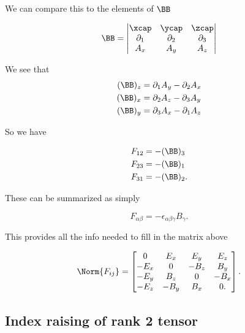 We can compare this to the elements of $\BB$

\begin{equation}\label{eqn:relativisticElectrodynamicsL11:110}
\BB = 
\begin{vmatrix}
\xcap & \ycap & \zcap \\
\partial_1 & \partial_2 & \partial_3 \\
A_x & A_y & A_z
\end{vmatrix}
\end{equation}

We see that 
\begin{align}\label{eqn:relativisticElectrodynamicsL11:130}
(\BB)_z &= \partial_1 A_y - \partial_2 A_x \\
(\BB)_x &= \partial_2 A_z - \partial_3 A_y \\
(\BB)_y &= \partial_3 A_x - \partial_1 A_z
\end{align}

So we have 

\begin{align}\label{eqn:relativisticElectrodynamicsL11:150}
F_{12} &= - (\BB)_3 \\
F_{23} &= - (\BB)_1 \\
F_{31} &= - (\BB)_2.
\end{align}

These can be summarized as simply

\begin{equation}\label{eqn:relativisticElectrodynamicsL11:170}
F_{\alpha\beta} = - \epsilon_{\alpha\beta\gamma} B_\gamma.
\end{equation}

This provides all the info needed to fill in the matrix above 

\begin{equation}\label{eqn:relativisticElectrodynamicsL11:190}
\Norm{ F_{ij} } = 
\begin{bmatrix}
0 & E_x & E_y & E_z \\
-E_x & 0 & -B_z & B_y \\
-E_y & B_z & 0 & -B_x \\
-E_z & -B_y & B_x & 0.
\end{bmatrix}.
\end{equation}

\subsection{Index raising of rank 2 tensor}

